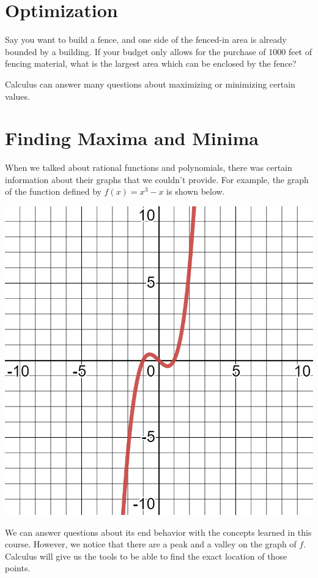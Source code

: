 \documentclass{ximera}
\begin{document}
\section{Optimization}
Say you want to build a fence, and one side of the fenced-in area is already bounded by a building. If your budget only allows for the purchase of 1000 feet of fencing material, what is the largest area which can be enclosed by the fence?

Calculus can answer many questions about maximizing or minimizing certain values. 

\section{Finding Maxima and Minima}
When we talked about rational functions and polynomials, there was certain information about their graphs that we couldn't provide. For example, the graph of the function defined by $f(x) = x^3 - x$ is shown below.

\begin{image}
\includegraphics{x-cubed-minus-x.png}
\end{image}

We can answer questions about its end behavior with the concepts learned in this course. However, we notice that there are a peak and a valley on the graph of $f$. Calculus will give us the tools to be able to find the exact location of those points. 
\end{document}
